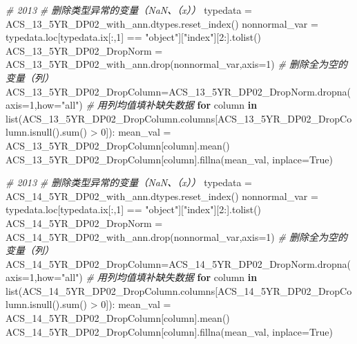 \documentclass[
]{article}
\newenvironment{Shaded}{}{}
\newcommand{\BuiltInTok}[1]{#1}
\newcommand{\CommentTok}[1]{\textcolor[rgb]{0.38,0.63,0.69}{\textit{#1}}}
\newcommand{\ControlFlowTok}[1]{\textcolor[rgb]{0.00,0.44,0.13}{\textbf{#1}}}
\newcommand{\DecValTok}[1]{\textcolor[rgb]{0.25,0.63,0.44}{#1}}
\newcommand{\KeywordTok}[1]{\textcolor[rgb]{0.00,0.44,0.13}{\textbf{#1}}}
\newcommand{\NormalTok}[1]{#1}
\newcommand{\OperatorTok}[1]{\textcolor[rgb]{0.40,0.40,0.40}{#1}}
\newcommand{\StringTok}[1]{\textcolor[rgb]{0.25,0.44,0.63}{#1}}
\newcommand{\VariableTok}[1]{\textcolor[rgb]{0.10,0.09,0.49}{#1}}
\begin{document}
\begin{Shaded}
\begin{Highlighting}[]
\CommentTok{\# 2013}
\CommentTok{\# 删除类型异常的变量（NaN、（x））}
\NormalTok{typedata }\OperatorTok{=}\NormalTok{ ACS\_13\_5YR\_DP02\_with\_ann.dtypes.reset\_index()}
\NormalTok{nonnormal\_var }\OperatorTok{=}\NormalTok{ typedata.loc[typedata.ix[:,}\DecValTok{1}\NormalTok{] }\OperatorTok{==} \StringTok{"object"}\NormalTok{][}\StringTok{"index"}\NormalTok{][}\DecValTok{2}\NormalTok{:].tolist()}
\NormalTok{ACS\_13\_5YR\_DP02\_DropNorm }\OperatorTok{=}\NormalTok{ ACS\_13\_5YR\_DP02\_with\_ann.drop(nonnormal\_var,axis}\OperatorTok{=}\DecValTok{1}\NormalTok{)}
\CommentTok{\# 删除全为空的变量（列）}
\NormalTok{ACS\_13\_5YR\_DP02\_DropColumn}\OperatorTok{=}\NormalTok{ACS\_13\_5YR\_DP02\_DropNorm.dropna(axis}\OperatorTok{=}\DecValTok{1}\NormalTok{,how}\OperatorTok{=}\StringTok{"all"}\NormalTok{)}
\CommentTok{\# 用列均值填补缺失数据}
\ControlFlowTok{for}\NormalTok{ column }\KeywordTok{in} \BuiltInTok{list}\NormalTok{(ACS\_13\_5YR\_DP02\_DropColumn.columns[ACS\_13\_5YR\_DP02\_DropColumn.isnull().}\BuiltInTok{sum}\NormalTok{() }\OperatorTok{\textgreater{}} \DecValTok{0}\NormalTok{]):}
\NormalTok{    mean\_val }\OperatorTok{=}\NormalTok{ ACS\_13\_5YR\_DP02\_DropColumn[column].mean()}
\NormalTok{    ACS\_13\_5YR\_DP02\_DropColumn[column].fillna(mean\_val, inplace}\OperatorTok{=}\VariableTok{True}\NormalTok{)}

\CommentTok{\# 2013}
\CommentTok{\# 删除类型异常的变量（NaN、（x））}
\NormalTok{typedata }\OperatorTok{=}\NormalTok{ ACS\_14\_5YR\_DP02\_with\_ann.dtypes.reset\_index()}
\NormalTok{nonnormal\_var }\OperatorTok{=}\NormalTok{ typedata.loc[typedata.ix[:,}\DecValTok{1}\NormalTok{] }\OperatorTok{==} \StringTok{"object"}\NormalTok{][}\StringTok{"index"}\NormalTok{][}\DecValTok{2}\NormalTok{:].tolist()}
\NormalTok{ACS\_14\_5YR\_DP02\_DropNorm }\OperatorTok{=}\NormalTok{ ACS\_14\_5YR\_DP02\_with\_ann.drop(nonnormal\_var,axis}\OperatorTok{=}\DecValTok{1}\NormalTok{)}
\CommentTok{\# 删除全为空的变量（列）}
\NormalTok{ACS\_14\_5YR\_DP02\_DropColumn}\OperatorTok{=}\NormalTok{ACS\_14\_5YR\_DP02\_DropNorm.dropna(axis}\OperatorTok{=}\DecValTok{1}\NormalTok{,how}\OperatorTok{=}\StringTok{"all"}\NormalTok{)}
\CommentTok{\# 用列均值填补缺失数据}
\ControlFlowTok{for}\NormalTok{ column }\KeywordTok{in} \BuiltInTok{list}\NormalTok{(ACS\_14\_5YR\_DP02\_DropColumn.columns[ACS\_14\_5YR\_DP02\_DropColumn.isnull().}\BuiltInTok{sum}\NormalTok{() }\OperatorTok{\textgreater{}} \DecValTok{0}\NormalTok{]):}
\NormalTok{    mean\_val }\OperatorTok{=}\NormalTok{ ACS\_14\_5YR\_DP02\_DropColumn[column].mean()}
\NormalTok{    ACS\_14\_5YR\_DP02\_DropColumn[column].fillna(mean\_val, inplace}\OperatorTok{=}\VariableTok{True}\NormalTok{)}
    

\end{Highlighting}
\end{Shaded}
\end{document}

